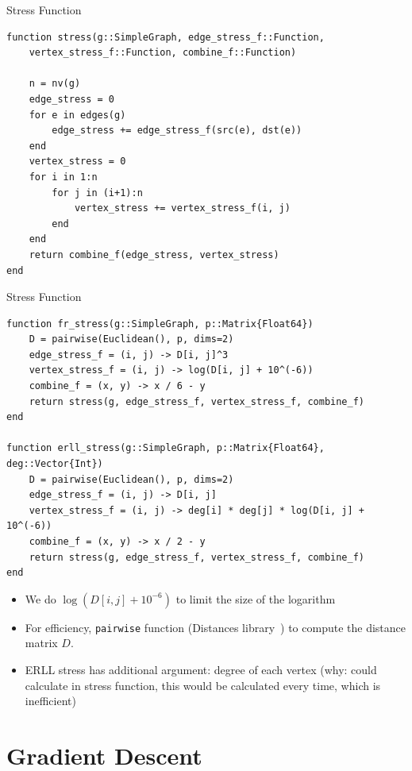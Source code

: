 \documentclass{beamer}
\begin{document}
\begin{frame}[fragile]{Stress Function}
\begin{verbatim}
function stress(g::SimpleGraph, edge_stress_f::Function, 
    vertex_stress_f::Function, combine_f::Function)

    n = nv(g)
    edge_stress = 0
    for e in edges(g)
        edge_stress += edge_stress_f(src(e), dst(e))
    end
    vertex_stress = 0
    for i in 1:n
        for j in (i+1):n
            vertex_stress += vertex_stress_f(i, j)
        end
    end
    return combine_f(edge_stress, vertex_stress)
end
\end{verbatim}
\end{frame}

\begin{frame}[fragile]{Stress Function}
\begin{verbatim}
function fr_stress(g::SimpleGraph, p::Matrix{Float64})
    D = pairwise(Euclidean(), p, dims=2)
    edge_stress_f = (i, j) -> D[i, j]^3
    vertex_stress_f = (i, j) -> log(D[i, j] + 10^(-6))
    combine_f = (x, y) -> x / 6 - y
    return stress(g, edge_stress_f, vertex_stress_f, combine_f)
end

function erll_stress(g::SimpleGraph, p::Matrix{Float64}, deg::Vector{Int})
    D = pairwise(Euclidean(), p, dims=2)
    edge_stress_f = (i, j) -> D[i, j]
    vertex_stress_f = (i, j) -> deg[i] * deg[j] * log(D[i, j] + 10^(-6))
    combine_f = (x, y) -> x / 2 - y
    return stress(g, edge_stress_f, vertex_stress_f, combine_f)
end
\end{verbatim}
\end{frame}

\begin{frame}
\begin{itemize}
    \item We do $\log(D[i, j] + 10^{-6})$ to limit the size of the logarithm
    \item For efficiency, \texttt{pairwise} function (Distances library~\cite{distancesjl}) to compute the distance matrix $D$.
    \item ERLL stress has additional argument: degree of each vertex (why: could calculate in stress function, this would be calculated every time, which is inefficient)
\end{itemize}
\end{frame}

\section{Gradient Descent}
\end{document}
